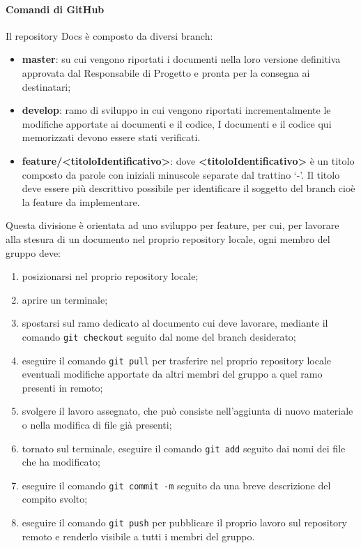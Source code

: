 			\paragraph{Comandi di GitHub}
				Il repository Docs è composto da diversi branch:
				\begin{itemize}
					\item\textbf{master}: su cui vengono riportati i documenti nella loro versione definitiva approvata dal Responsabile di Progetto e pronta per la consegna ai destinatari;
					\item\textbf{develop}: ramo di sviluppo in cui vengono riportati incrementalmente le modifiche apportate ai documenti e il codice, I documenti e il codice qui memorizzati devono essere stati verificati.
					\item\textbf{feature/<titoloIdentificativo>}: dove \textbf{<titoloIdentificativo>} è un titolo composto da parole con iniziali minuscole separate dal trattino ‘-’. Il titolo deve essere più descrittivo possibile per identificare il soggetto del branch cioè la feature da implementare.
				\end{itemize}
				Questa divisione è orientata ad uno sviluppo per feature, per cui, per lavorare alla stesura di un documento nel proprio repository locale, ogni membro del gruppo deve:
				\begin{enumerate}
					\item posizionarsi nel proprio repository locale;
					\item aprire un terminale;
					\item spostarsi sul ramo dedicato al documento cui deve lavorare, mediante il comando \texttt{git checkout} seguito dal nome del branch desiderato;
					\item eseguire il comando \texttt{git pull} per trasferire nel proprio repository locale eventuali modifiche apportate da altri membri del gruppo a quel ramo presenti in remoto;
					\item svolgere il lavoro assegnato, che può consiste nell'aggiunta di nuovo materiale o nella modifica di file già presenti;
					\item tornato sul terminale, eseguire il comando \texttt{git add} seguito dai nomi dei file che ha modificato;
					\item eseguire il comando \texttt{git commit -m} seguito da una breve descrizione del compito svolto;
					\item eseguire il comando \texttt{git push} per pubblicare il proprio lavoro sul repository remoto e renderlo visibile a tutti i membri del gruppo.
				\end{enumerate}
				
